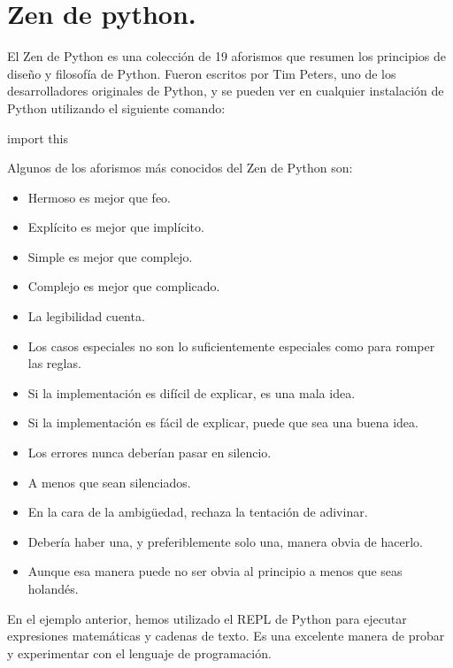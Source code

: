 \documentclass[
  a4paper,
  DIV=11,
  numbers=noendperiod,
  onepage,
  openany]{scrreprt}
\newenvironment{Shaded}{\begin{snugshade}}{\end{snugshade}}
\newcommand{\ExtensionTok}[1]{\textcolor[rgb]{0.00,0.23,0.31}{#1}}
\newcommand{\NormalTok}[1]{\textcolor[rgb]{0.00,0.23,0.31}{#1}}
\begin{document}
\chapter{Zen de python.}\label{zen-de-python.}

El Zen de Python es una colección de 19 aforismos que resumen los
principios de diseño y filosofía de Python. Fueron escritos por Tim
Peters, uno de los desarrolladores originales de Python, y se pueden ver
en cualquier instalación de Python utilizando el siguiente comando:

\begin{Shaded}
\begin{Highlighting}[]
\ExtensionTok{import}\NormalTok{ this}
\end{Highlighting}
\end{Shaded}

Algunos de los aforismos más conocidos del Zen de Python son:

\begin{itemize}
\item
  Hermoso es mejor que feo.
\item
  Explícito es mejor que implícito.
\item
  Simple es mejor que complejo.
\item
  Complejo es mejor que complicado.
\item
  La legibilidad cuenta.
\item
  Los casos especiales no son lo suficientemente especiales como para
  romper las reglas.
\item
  Si la implementación es difícil de explicar, es una mala idea.
\item
  Si la implementación es fácil de explicar, puede que sea una buena
  idea.
\item
  Los errores nunca deberían pasar en silencio.
\item
  A menos que sean silenciados.
\item
  En la cara de la ambigüedad, rechaza la tentación de adivinar.
\item
  Debería haber una, y preferiblemente solo una, manera obvia de
  hacerlo.
\item
  Aunque esa manera puede no ser obvia al principio a menos que seas
  holandés.
\end{itemize}

En el ejemplo anterior, hemos utilizado el REPL de Python para ejecutar
expresiones matemáticas y cadenas de texto. Es una excelente manera de
probar y experimentar con el lenguaje de programación.
\end{document}
